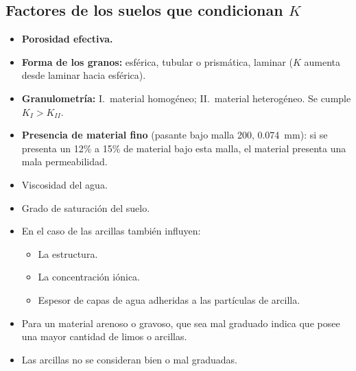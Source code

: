 \begin{table}[H]
\centering
{}
\caption{Valores típicos de permeabilidad intrínseca y conductividad hidráulica.}
\end{table}

\subsection{Factores de los suelos que condicionan $K$}
\begin{itemize}
  \item \textbf{Porosidad efectiva.}
  \item \textbf{Forma de los granos:} esférica, tubular o prismática, laminar
        ($K$ aumenta desde laminar hacia esférica).
  \item \textbf{Granulometría:} I.~material homogéneo; II.~material heterogéneo.
        Se cumple $K_I>K_{II}$.
  \item \textbf{Presencia de material fino} (pasante bajo malla 200,
        0.074~mm): si se presenta un 12\% a 15\% de material bajo esta malla,
        el material presenta una mala permeabilidad.
  \item Viscosidad del agua.
  \item Grado de saturación del suelo.
  \item En el caso de las arcillas también influyen:
  \begin{itemize}
    \item La estructura.
    \item La concentración iónica.
    \item Espesor de capas de agua adheridas a las partículas de arcilla.
  \end{itemize}
  \item Para un material arenoso o gravoso, que sea mal graduado indica que
        posee una mayor cantidad de limos o arcillas.
  \item Las arcillas no se consideran bien o mal graduadas.
\end{itemize}

